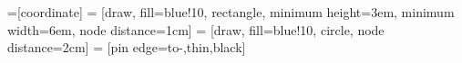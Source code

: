 
\usepackage{amsmath, float, graphicx, listings, alltt, multicol, hyperref, amssymb, subcaption}
\usepackage[ruled,vlined]{algorithm2e}

\usepackage{tikz} %
\usetikzlibrary{shapes,arrows,positioning}
=[coordinate]
 = [draw, fill=blue!10, rectangle, minimum height=3em, minimum width=6em, node distance=1cm]
 = [draw, fill=blue!10, circle, node distance=2cm]
 = [pin edge={to-,thin,black}]

